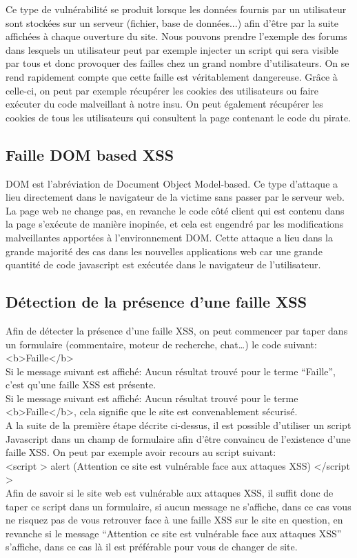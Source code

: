 Ce type de vulnérabilité se produit lorsque les données fournis par un utilisateur sont stockées sur un serveur (fichier, base de données...) afin d’être par la suite affichées à chaque ouverture du site. Nous pouvons prendre l’exemple des forums dans lesquels un utilisateur peut par exemple injecter un script qui sera visible par tous et donc provoquer des failles chez un grand nombre d’utilisateurs. On se rend rapidement compte que cette faille est véritablement dangereuse. Grâce à celle-ci, on peut par exemple récupérer les cookies des utilisateurs ou faire exécuter du code malveillant à notre insu. On peut également récupérer les cookies de tous les utilisateurs qui consultent la page contenant le code du pirate.

\subsection{Faille DOM based XSS}

DOM est l’abréviation de Document Object Model-based. 
Ce type d’attaque a lieu directement dans le navigateur de la victime sans passer par le serveur web. La page web ne change pas, en revanche le code côté client qui est contenu dans la page s'exécute de manière inopinée, et cela est engendré par les modifications malveillantes apportées à l’environnement DOM.
Cette attaque a lieu dans la grande majorité des cas dans les nouvelles applications web car une grande quantité de code javascript est exécutée dans le navigateur de l’utilisateur.

\subsection{Détection de la présence d’une faille XSS}

Afin de détecter la présence d’une faille XSS, on peut commencer par taper dans un formulaire (commentaire, moteur de recherche, chat…) le code suivant:\\
<b>Faille</b>\\
Si le message suivant est affiché: Aucun résultat trouvé pour le terme “Faille”, c’est qu’une faille XSS est présente.\\
Si le message suivant est affiché: Aucun résultat trouvé pour le terme <b>Faille</b>, cela signifie que le site est convenablement sécurisé.\\
A la suite de la première étape décrite ci-dessus, il est possible d’utiliser un script Javascript dans un champ de formulaire afin d’être convaincu de l’existence d’une faille XSS.
On peut par exemple avoir recours au script suivant:\\
<script > alert (Attention ce site est vulnérable face aux attaques XSS) </script >\\
Afin de savoir si le site web est vulnérable aux attaques XSS, il suffit donc de taper ce script dans un formulaire, si aucun message ne s’affiche, dans ce cas vous ne risquez pas de vous retrouver face à une faille XSS sur le site en question, en revanche si le message “Attention ce site est vulnérable face aux attaques XSS” s’affiche, dans ce cas là il est préférable pour vous de changer de site.

